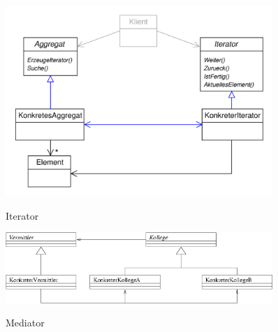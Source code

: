 \begin{figure}[htb]
    \centering
    \begin{minipage}[t]{0.45\linewidth}
		\centering
		\includegraphics[width=0.9\textwidth]{images/iterator}
		\label{fig:iterator}
		\caption{Iterator}
	\end{minipage}%
	\hfill
    \begin{minipage}[t]{0.45\linewidth}
		\centering
		\includegraphics[width=0.9\textwidth]{images/mediator}
		\label{fig:mediator}
		\caption{Mediator}
	\end{minipage}
\end{figure}


